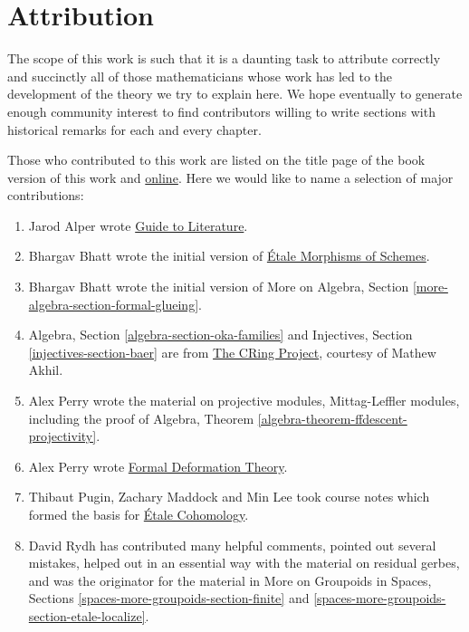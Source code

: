 \section{Attribution}
\label{section-attribution}

\noindent
The scope of this work is such that it is a daunting task to attribute
correctly and succinctly all of those mathematicians whose work has led
to the development of the theory we try to explain here. We hope eventually
to generate enough community interest to find contributors willing to write
sections with historical remarks for each and every chapter.

\medskip\noindent
Those who contributed to this work are listed on the title page of the book
version of this work and
\href{http://math.columbia.edu/algebraic_geometry/stacks-git/CONTRIBUTORS}%
{online}.
Here we would like to name a selection of major contributions:
\begin{enumerate}
\item Jarod Alper wrote
\hyperref[guide-section-phantom]{Guide to Literature}.
\item Bhargav Bhatt wrote the initial version of
\hyperref[etale-section-phantom]{\'Etale Morphisms of Schemes}.
\item Bhargav Bhatt wrote the initial version of
More on Algebra, Section \ref{more-algebra-section-formal-glueing}.
\item Algebra, Section \ref{algebra-section-oka-families}
and Injectives, Section \ref{injectives-section-baer}
are from
\href{http://people.fas.harvard.edu/~amathew/cr.html}{The CRing Project},
courtesy of Mathew Akhil.
\item Alex Perry wrote the material on projective modules,
Mittag-Leffler modules, including the proof of
Algebra, Theorem \ref{algebra-theorem-ffdescent-projectivity}.
\item Alex Perry wrote
\hyperref[formal-defos-section-phantom]%
{Formal Deformation Theory}.
\item Thibaut Pugin, Zachary Maddock and Min Lee took course notes
which formed the basis for
\hyperref[etale-cohomology-section-phantom]{\'Etale Cohomology}.
\item David Rydh has contributed many helpful comments, pointed out several
mistakes, helped out in an essential way with the material on residual gerbes,
and was the originator for the material in
More on Groupoids in Spaces, Sections
\ref{spaces-more-groupoids-section-finite} and
\ref{spaces-more-groupoids-section-etale-localize}.
\end{enumerate}










